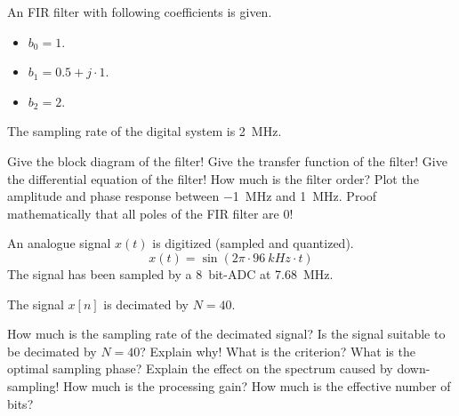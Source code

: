 \begin{question}[subtitle={FIR Filter}]
	An FIR filter with following coefficients is given.
	\begin{itemize}
		\item $b_0 = 1$.
		\item $b_1 = 0.5 + j \cdot 1$.
		\item $b_2 = 2$.
	\end{itemize}

	The sampling rate of the digital system is \SI{2}{MHz}.
	
	\begin{tasks}
		\task
		Give the block diagram of the filter!
		\task
		Give the transfer function of the filter!
		\task
		Give the differential equation of the filter!
		\task
		How much is the filter order?
		\task
		Plot the amplitude and phase response between \SI{-1}{MHz} and \SI{1}{MHz}.
		\task
		Proof mathematically that all poles of the FIR filter are $0$!
	\end{tasks}
\end{question}

\begin{solution}
	\begin{tasks}
	\end{tasks}
\end{solution}


\begin{question}[subtitle={Down-sampling}]
	An analogue signal $x(t)$ is digitized (sampled and quantized).
	\begin{equation*}
		x(t) = \sin\left(2 \pi \cdot \SI{96}{kHz} \cdot t\right)
	\end{equation*}
	The signal has been sampled by a \SI{8}{bit}-ADC at \SI{7.68}{MHz}.
	
	The signal $x[n]$ is decimated by $N = 40$.
	
	\begin{tasks}
		\task
		How much is the sampling rate of the decimated signal?
		\task
		Is the signal suitable to be decimated by $N = 40$? Explain why! What is the criterion?
		\task
		What is the optimal sampling phase?
		\task
		Explain the effect on the spectrum caused by down-sampling!
		\task
		How much is the processing gain? How much is the effective number of bits?
	\end{tasks}
\end{question}

